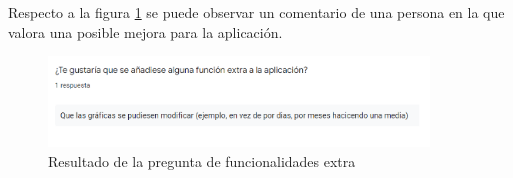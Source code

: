 Respecto a la figura \ref{fig:grafico_13} se puede observar un comentario de una persona en la que valora una posible mejora para la aplicación.

\begin{figure}[H]
    \centering
    \includegraphics[width=0.9\textwidth]{Images/Capitulo8/Capitulo8.2/grafico13.png}
    \caption{Resultado de la pregunta de funcionalidades extra}
    \label{fig:grafico_13}
\end{figure}